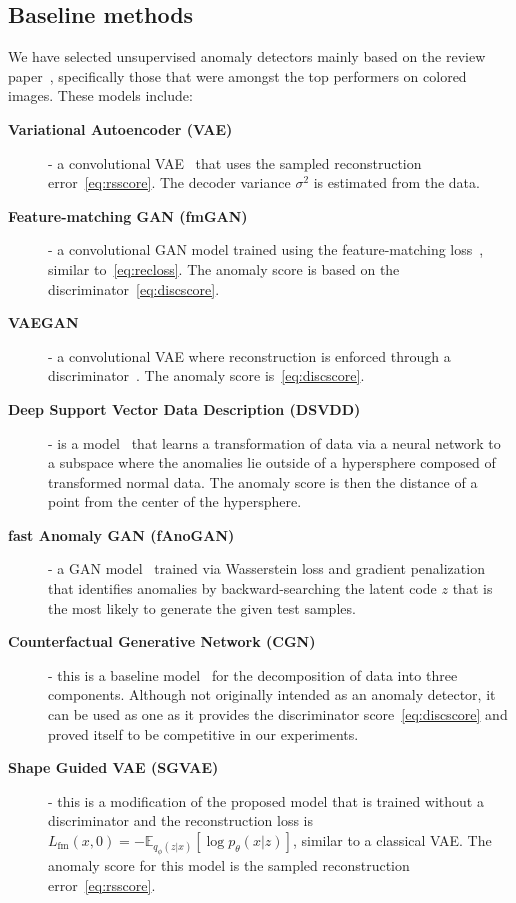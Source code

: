 \subsection{Baseline methods}
We have selected unsupervised anomaly detectors mainly based on the review paper~\cite{vskvara2021comparison}, specifically those that were amongst the top performers on colored images. These models include:

\begin{description}
    \item[\textbf{Variational Autoencoder (VAE)}] - a convolutional VAE~\cite{an2015variational, kingma2013vae} that uses the sampled reconstruction error~\eqref{eq:rsscore}. The decoder variance $\sigma^2$ is estimated from the data.
    \item[\textbf{Feature-matching GAN (fmGAN)}] - a convolutional GAN model trained using the feature-matching loss~\cite{salimans2016fmgan}, similar to~\eqref{eq:recloss}. The anomaly score is based on the discriminator~\eqref{eq:discscore}.
    \item[\textbf{VAEGAN}] - a  convolutional VAE where reconstruction is enforced through a discriminator~\cite{larsen2016autoencoding}. The anomaly score is~\eqref{eq:discscore}.
    \item[\textbf{Deep Support Vector Data Description (DSVDD)}] - is a model~\cite{ruff2018deep} that learns a transformation of data via a neural network to a subspace where the anomalies lie outside of a hypersphere composed of transformed normal data. The anomaly score is then the distance of a point from the center of the hypersphere.
    \item[\textbf{fast Anomaly GAN (fAnoGAN)}] - a GAN model~\cite{schleglFAnoGANFastUnsupervised2019} trained via Wasserstein loss and gradient penalization that identifies anomalies by backward-searching the latent code $z$ that is the most likely to generate the given test samples.
    \item[\textbf{Counterfactual Generative Network (CGN)}] - this is a baseline model~\cite{sauer2021counterfactual} for the decomposition of data into three components. Although not originally intended as an anomaly detector, it can be used as one as it provides the discriminator score~\eqref{eq:discscore} and proved itself to be competitive in our experiments.
    \item[\textbf{Shape Guided VAE (SGVAE)}] - this is a modification of the proposed model that is trained without a discriminator and the reconstruction loss is $L_{\text{fm}}(x,0) = -\mathbb{E}_{q_{\phi}(z \vert x)}[\log p_{\theta}(x \vert z)]$, similar to a classical VAE. The anomaly score for this model is the sampled reconstruction error~\eqref{eq:rsscore}.

\end{description}
